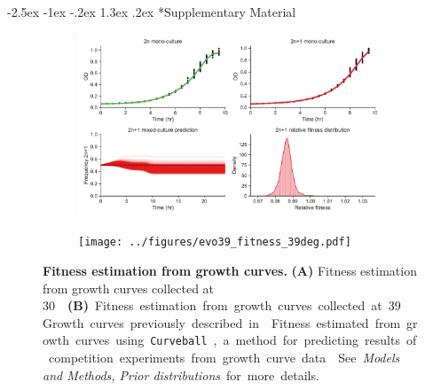 \documentclass[12pt]{extarticle}
\makeatletter
\renewcommand\section{\@startsection {section}{1}{\z@}%
     {-2.5ex \@plus -1ex \@minus -.2ex}%
     {1.3ex \@plus.2ex}%
    {\Large\bfseries}}
\newcommand{\beginsupplement}{%
      	\setcounter{table}{0}
        \renewcommand{\thetable}{S\arabic{table}}%
        \setcounter{figure}{0}
        \renewcommand{\thefigure}{S\arabic{figure}}%
}
\makeatother
\begin{document}
\section*{Supplementary Material}
\beginsupplement %


\begin{figure}[h]
\begin{subfigure}{0.5\textwidth}
    \centering
	\includegraphics[width=\textwidth]{../figures/evo39_fitness_30deg.pdf}
    \label{fig:growth-curves-30deg}
\end{subfigure}
\begin{subfigure}{0.5\textwidth}
    \centering
	\texttt{[image: ../figures/evo39\_fitness\_39deg.pdf]}
    \label{fig:growth-curves-39deg}
\end{subfigure}
\caption{
    \textbf{Fitness estimation from growth curves.}
    \textbf{(A)} Fitness estimation from growth curves collected at \SI{30}.{\celsius}
    \textbf{(B)} Fitness estimation from growth curves collected at \SI{39}.{\celsius}
    Growth curves previously described in \citet[Figs. 3C, 4A, and S2]{Yona2012}.
	Fitness estimated from growth curves using \texttt{Curveball}, a method for predicting results of competition experiments from growth curve data~\citep[\href{https://curveball.yoavram.com}{curveball.yoavram.com}]{Ram2019}. See \emph{Models and Methods, Prior distributions} for more details.
} 
\label{fig:growth-curves}
\end{figure}
\end{document}
